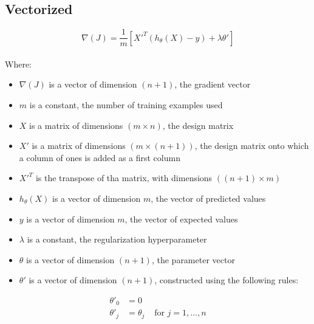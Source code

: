 \subsection*{Vectorized}
$$
\nabla(J) = \frac{1}{m} [X'^T(h_\theta(X) - y) + \lambda \theta']
$$  
\\
Where:
\begin{itemize}
  \item $\nabla(J)$ is a vector of dimension $(n + 1)$, the gradient vector
  \item $m$ is a constant, the number of training examples used
  \item $X$ is a matrix of dimensions $(m \times n)$, the design matrix
  \item $X'$ is a matrix of dimensions $(m \times (n + 1))$, the design matrix 
  onto which a column of ones is added as a first column
  \item $X'^T$ is the transpose of tha matrix, with dimensions $((n + 1) \times m)$
  \item $h_\theta(X)$ is a vector of dimension $m$, the vector of predicted values 
  \item $y$ is a vector of dimension $m$, the vector of expected values
  \item $\lambda$ is a constant, the regularization hyperparameter
  \item $\theta$ is a vector of dimension $(n + 1)$, the parameter vector
  \item $\theta'$ is a vector of dimension $(n + 1)$, constructed using the following rules: 
\end{itemize}

$$
\begin{matrix}
\theta'_0 & =  0 \\
\theta'_j & =  \theta_j & \text{ for } j = 1, \dots, n\\
\end{matrix}
$$
\newpage
